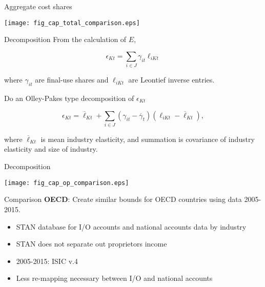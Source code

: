 \documentclass[10pt, xcolor=dvipsnames]{beamer}
\begin{document}
\begin{frame}{Aggregate cost shares}
\begin{center}
\texttt{[image: fig\_cap\_total\_comparison.eps]}
\end{center}
\end{frame}


\begin{frame}{Decomposition}
From the calculation of $E$,

\begin{equation}
  \epsilon_{Kt} = \sum_{i \in J} \gamma_{it} \ell_{iKt}
\end{equation}

where $\gamma_{it}$ are final-use shares and $\ell_{iKt}$ are Leontief inverse entries. 

\vspace{.25in} Do an Olley-Pakes type decomposition of $\epsilon_{Kt}$

\begin{equation}
  \epsilon_{Kt} = \overline{\ell}_{Kt} + \sum_{i \in J} (\gamma_{it} - \overline{\gamma}_{t})(\ell_{iKt}-\overline{\ell}_{Kt}), \label{EQ_op}
\end{equation}

where $\overline{\ell}_{Kt}$ is mean industry elasticity, and summation is covariance of industry elasticity and size of industry.

\end{frame}

\begin{frame}{Decomposition}
\begin{center}
\texttt{[image: fig\_cap\_op\_comparison.eps]}
\end{center}
\end{frame}


\begin{frame}{Comparison}
\textbf{OECD}: Create similar bounds for OECD countries using data 2005-2015.

\begin{itemize}
  \item STAN database for I/O accounts and national accounts data by industry
  \item STAN does not separate out proprietors income
  \item 2005-2015: ISIC v.4
  \item Less re-mapping necessary between I/O and national accounts
\end{itemize}

\end{frame}
\end{document}
